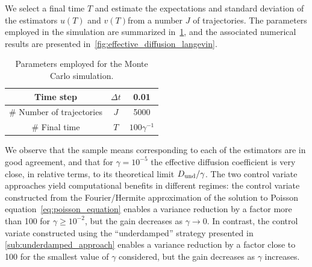 \documentclass[11pt,a4paper]{article}
\newcommand{\e}{\mathrm{e}}
\newcommand{\expect}[0]{\mathbf{E}}
\renewcommand{\d}{\mathrm d}
\theoremstyle{plain}
\numberwithin{equation}{section}
\renewcommand{\geq}{\geqslant}
\begin{document}

We select a final time $T$ and estimate the expectations and standard deviation of the estimators $u(T)$ and $v(T)$from a number $J$ of trajectories.
The parameters employed in the simulation are summarized in~\cref{table:parameters_employed_for_mc},
and the associated numerical results are presented in~\cref{fig:effective_diffusion_langevin}.
\begin{table}[ht]
    \centering
    \begin{tabular}{|c|c|c|}
        \hline
        Time step & $\Delta t$ & 0.01 \\
        \hline
        \# Number of trajectories & $J$ & 5000 \\
        \hline
        \# Final time & $T$ & $100 \gamma^{-1}$ \\
        \hline
    \end{tabular}
    \caption{Parameters employed for the Monte Carlo simulation.}
    \label{table:parameters_employed_for_mc}
\end{table}
We observe that the sample means corresponding to each of the estimators are in good agreement,
and that for $\gamma = 10^{-5}$ the effective diffusion coefficient is very close, in relative terms,
to its theoretical limit $D_{\rm und}/\gamma$.
The two control variate approaches yield computational benefits in different regimes:
the control variate constructed from the Fourier/Hermite approximation of the solution to Poisson equation~\eqref{eq:poisson_equation}
enables a variance reduction by a factor more than 100 for $\gamma \geq 10^{-2}$,
but the gain decreases as $\gamma \to 0$.
In contrast, the control variate constructed using the ``underdamped'' strategy presented in \cref{sub:underdamped_approach} enables a variance reduction by a factor close to 100 for the smallest value of $\gamma$ considered,
but the gain decreases as $\gamma$ increases.
\end{document}
